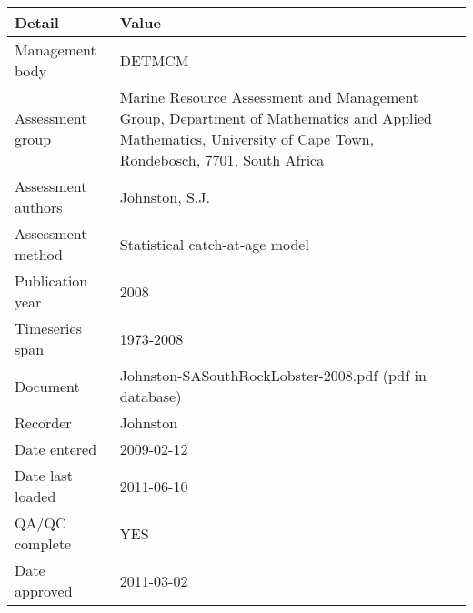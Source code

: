 \begin{table}[htb]
\centering
\begin{tabular}{lp{7cm}}
\toprule
Detail & Value \\
\midrule
Management body    & DETMCM                                                                                                                                                      \\
Assessment group   & Marine Resource Assessment and Management Group, Department of Mathematics and Applied Mathematics, University of Cape Town, Rondebosch, 7701, South Africa \\
Assessment authors & Johnston, S.J.                                                                                                                                              \\
Assessment method  & Statistical catch-at-age model                                                                                                                              \\
Publication year   & 2008                                                                                                                                                        \\
Timeseries span    & 1973-2008                                                                                                                                                   \\
Document           & Johnston-SASouthRockLobster-2008.pdf (pdf in database)                                                                                                      \\
Recorder           & Johnston                                                                                                                                                    \\
Date entered       & 2009-02-12                                                                                                                                                  \\
Date last loaded   & 2011-06-10                                                                                                                                                  \\
QA/QC complete     & YES                                                                                                                                                         \\
Date approved      & 2011-03-02                                                                                                                                                  \\
\bottomrule
\end{tabular}
\label{tab:assessdet}
\end{table}
